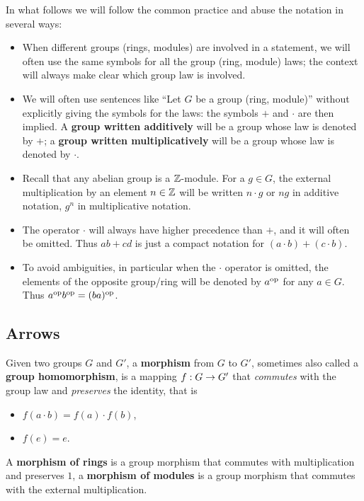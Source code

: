In what follows we will follow the common practice and abuse the
notation in several ways:
\begin{itemize}
\item When different groups (rings, modules) are involved in a
  statement, we will often use the same symbols for all the group
  (ring, module) laws; the context will always make clear which group
  law is involved.
\item We will often use sentences like ``Let $G$ be a group (ring,
  module)'' without explicitly giving the symbols for the laws: the
  symbols $+$ and $\cdot$ are then implied. A
  \textbf{group written additively}
  will be a group whose law is denoted by $+$; a
  \textbf{group written
    multiplicatively} will be a group whose law is denoted by $\cdot$.
\item Recall that any abelian group is a $\mathbb{Z}$-module. For a $g\in G$,
  the external multiplication by an element $n\in\mathbb{Z}$ will be written
  $n\cdot g$ or $ng$ in additive notation, $g^n$ in multiplicative
  notation.
\item The operator $\cdot$ will always have higher precedence than
  $+$, and it will often be omitted. Thus $ab+cd$ is just a compact
  notation for $(a\cdot b) + (c\cdot b)$.
\item To avoid ambiguities, in particular when the $\cdot$ operator is
  omitted, the elements of the opposite group/ring will be denoted by
  $a^{\mathrm{op}}$ for any $a\in G$. Thus $a^{\mathrm{op}} b^{\mathrm{op}}=(ba)^{\mathrm{op}}$.
\end{itemize}


\subsection{Arrows}
\label{sec:ring-fields:arrows}

Given two groups $G$ and $G'$, a
\textbf{morphism} from $G$ to $G'$,
sometimes also called a
\textbf{group homomorphism}, is a
mapping $f:G\rightarrow G'$ that \emph{commutes} with the group law and
\emph{preserves} the identity, that is
\begin{itemize}
\item $f(a\cdot b) = f(a) \cdot f(b)$,
\item $f(e) = e$.
\end{itemize}

A \textbf{morphism of rings} is a group
morphism that commutes with multiplication and preserves $1$, a
\textbf{morphism of modules} is a group
morphism that commutes with the external multiplication.

